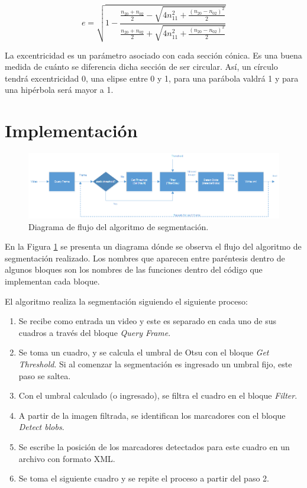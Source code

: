 \begin{equation}
e = \sqrt{1-\frac{\frac{n_{20}+n_{02}}{2}-\sqrt{4n_{11}^2+\frac{(n_{20}-n_{02})^2}{2}}}{\frac{n_{20}+n_{02}}{2}+\sqrt{4n_{11}^2+\frac{(n_{20}-n_{02})^2}{2}}}}
\label{excentec}
\end{equation}

La excentricidad es un parámetro asociado con cada sección cónica. Es una buena medida de cuánto se diferencia dicha sección de ser circular. Así, un círculo tendrá excentricidad 0, una elipse entre 0 y 1, para una parábola valdrá 1 y para una hipérbola será mayor a 1.

\section{Implementación}
\label{implementSegment}

\begin{figure}[H]
\hspace{-1.5cm}
\includegraphics[scale=0.7]{img/diagrama_segmentacion.png}
\caption{Diagrama de flujo del algoritmo de segmentación.}
\label{diagramaSegmentacion}
\end{figure}

En la Figura \ref{diagramaSegmentacion} se presenta un diagrama dónde se observa el flujo del algoritmo de segmentación realizado. Los nombres que aparecen entre paréntesis dentro de algunos bloques son los nombres de las funciones dentro del código que implementan cada bloque. 

El algoritmo realiza la segmentación siguiendo el siguiente proceso:

\begin{enumerate}
  \item Se recibe como entrada un video y este es separado en cada uno de sus cuadros a través del bloque \emph{Query Frame}.
  \item Se toma un cuadro, y se calcula el umbral de Otsu con el bloque \emph{Get Threshold}. Si al comenzar la segmentación es ingresado un umbral fijo, este paso se saltea.
  \item Con el umbral calculado (o ingresado), se filtra el cuadro en el bloque \emph{Filter}.
  \item A partir de la imagen filtrada, se identifican los marcadores con el bloque \emph{Detect blobs}.
  \item Se escribe la posición de los marcadores detectados para este cuadro en un archivo con formato XML.
  \item Se toma el siguiente cuadro y se repite el proceso a partir del paso 2.
\end{enumerate}


